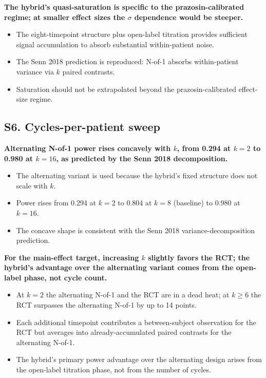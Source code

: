 \documentclass[
  11pt,
]{article}
\begin{document}
\textbf{The hybrid's quasi-saturation is specific to the prazosin-calibrated regime; at smaller effect sizes the $\sigma$ dependence would be steeper.}

\begin{itemize}\setlength{\itemsep}{2pt}\setlength{\parskip}{0pt}
\item The eight-timepoint structure plus open-label titration provides sufficient signal accumulation to absorb substantial within-patient noise.
\item The Senn 2018 prediction is reproduced: N-of-1 absorbs within-patient variance via $k$ paired contrasts.
\item Saturation should not be extrapolated beyond the prazosin-calibrated effect-size regime.
\end{itemize}

\subsection{S6. Cycles-per-patient sweep}\label{s6.-cycles-per-patient-sweep}

\textbf{Alternating N-of-1 power rises concavely with $k$, from 0.294 at $k = 2$ to 0.980 at $k = 16$, as predicted by the Senn 2018 decomposition.}

\begin{itemize}\setlength{\itemsep}{2pt}\setlength{\parskip}{0pt}
\item The alternating variant is used because the hybrid's fixed structure does not scale with $k$.
\item Power rises from 0.294 at $k = 2$ to 0.804 at $k = 8$ (baseline) to 0.980 at $k = 16$.
\item The concave shape is consistent with the Senn 2018 variance-decomposition prediction.
\end{itemize}

\textbf{For the main-effect target, increasing $k$ slightly favors the RCT; the hybrid's advantage over the alternating variant comes from the open-label phase, not cycle count.}

\begin{itemize}\setlength{\itemsep}{2pt}\setlength{\parskip}{0pt}
\item At $k = 2$ the alternating N-of-1 and the RCT are in a dead heat; at $k \geq 6$ the RCT surpasses the alternating N-of-1 by up to 14 points.
\item Each additional timepoint contributes a between-subject observation for the RCT but averages into already-accumulated paired contrasts for the alternating N-of-1.
\item The hybrid's primary power advantage over the alternating design arises from the open-label titration phase, not from the number of cycles.
\end{itemize}
\end{document}
